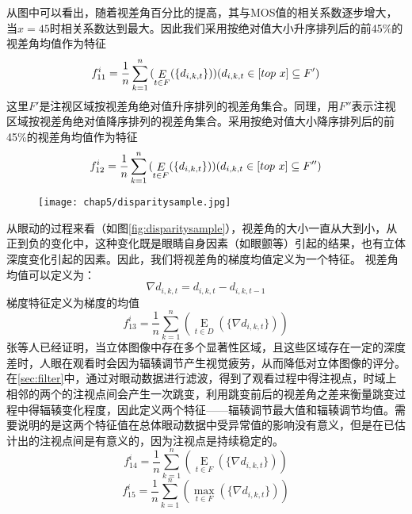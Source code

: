 从图中可以看出，随着视差角百分比的提高，其与MOS值的相关系数逐步增大，当$x=45$时相关系数达到最大。因此我们采用按绝对值大小升序排列后的前45\%的视差角均值作为特征
\begin{equation}
\label{eq:f11}
{f_{11}^i} = \frac{1}{n}\sum\limits_{k = 1}^n {(\mathop E\limits_{t \in F} (\{ {d_{i,k,t}}\} ))} ({d_{i,k,t}} \in [top{\rm{ }}\ x] \subseteq F')
\end{equation}
这里$F'$是注视区域按视差角绝对值升序排列的视差角集合。同理，用$F''$表示注视区域按视差角绝对值降序排列的视差角集合。采用按绝对值大小降序排列后的前45\%的视差角均值作为特征
\begin{equation}
\label{eq:f12}
{f_{12}^i} = \frac{1}{n}\sum\limits_{k = 1}^n {(\mathop E\limits_{t \in F} (\{ {d_{i,k,t}}\} ))} ({d_{i,k,t}} \in [top{\rm{ }}\ x] \subseteq F'')
\end{equation}
\begin{figure}[!htp]
  \centering
  \texttt{[image: chap5/disparitysample.jpg]}
\end{figure}
从眼动的过程来看（如图\ref{fig:disparitysample}），视差角的大小一直从大到小，从正到负的变化中，这种变化既是眼睛自身因素（如眼颤等）引起的结果，也有立体深度变化引起的因素。因此，我们将视差角的梯度均值定义为一个特征。
视差角均值可以定义为：
\begin{equation}
\label{eq:f13}
\nabla {d_{i,k,t}} = {d_{i,k,t}} - {d_{i,k,t - 1}}
\end{equation}
梯度特征定义为梯度的均值
\begin{equation}
{f_{13}^i}  = \frac{1}{n}\sum\limits_{k = 1}^n {(\mathop E\limits_{t \in D} (\{ \nabla {d_{i,k,t}}\} ))}
\end{equation}
张\parencite{zhang2015visual}等人已经证明，当立体图像中存在多个显著性区域，且这些区域存在一定的深度差时，人眼在观看时会因为辐辏调节产生视觉疲劳，从而降低对立体图像的评分。在\ref{sec:filter}中，通过对眼动数据进行滤波，得到了观看过程中得注视点，时域上相邻的两个的注视点间会产生一次跳变，利用跳变前后的视差角之差来衡量跳变过程中得辐辏变化程度，因此定义两个特征——辐辏调节最大值和辐辏调节均值。需要说明的是这两个特征值在总体眼动数据中受异常值的影响没有意义，但是在已估计出的注视点间是有意义的，因为注视点是持续稳定的。
\begin{equation}
{f_{14}^i}  =  \frac{1}{n}\sum\limits_{k = 1}^n {(\mathop E\limits_{t \in F} (\{ \nabla {d_{i,k,t}}\} ))}\end{equation}
\begin{equation}
{f_{15}^i}  = \frac{1}{n}\sum\limits_{k = 1}^n {(\mathop {\max }\limits_{t \in F} (\{ \nabla {d_{i,k,t}}\} ))}\end{equation}

